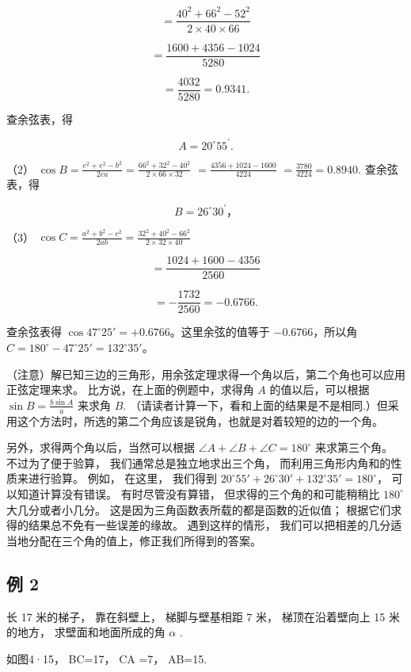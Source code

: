 \[
= \frac {40 ^ {2} + 66 ^ {2} - 52 ^ {2}}{2 \times 40 \times 66}
\]

\[
= \frac {1600 + 4356 - 1024}{5280}
\]

\[
= \frac {4032}{5280} = 0.9341.
\]

查余弦表，得

\[
A = 20 ^{\circ} 55 ^{\prime}.
\]

（2）
\(\cos B = \frac{e^2 + e^2 - b^2}{2ca} = \frac{66^2 + 32^2 - 40^2}{2 \times 66 \times 32}\)
\(= \frac{4356 + 1024 - 1600}{4224}\) \(= \frac{3780}{4224} = 0.8940.\)
查余弦表，得

\[
B = 26 ^{\circ} 30 ^{\prime}\text{，}
\]

（3）
\(\cos C = \frac{a^2 + b^2 - c^2}{2ab} = \frac{32^2 + 40^2 - 66^2}{2 \times 32 \times 40}\)

\[
= \frac {1024 + 1600 - 4356}{2560}
\]

\[
= - \frac {1732}{2560} = - 0.6766.
\]

查余弦表得 \(\cos 47^{\circ}25' = +0.6766\)。这里余弦的值等于
\(-0.6766\)，所以角
\(C = 180^{\circ} - 47^{\circ}25' = 132^{\circ}35'\)。

（注意）解已知三边的三角形，用余弦定理求得一个角以后，第二个角也可以应用正弦定理来求。
比方说，在上面的例题中，求得角 \(A\) 的值以后，可以根据
\(\sin B = \frac{b\sin A}{a}\) 来求角 \(B\).
（请读者计算一下，看和上面的结果是不是相同.）但采用这个方法时，所选的第二个角应该是锐角，也就是对着较短的边的一个角。

另外，求得两个角以后，当然可以根据
\(\angle A + \angle B + \angle C = 180^{\circ}\) 来求第三个角。
不过为了便于验算， 我们通常总是独立地求出三个角，
而利用三角形内角和的性质来进行验算。 例如， 在这里， 我们得到
\(20^{\circ}55' + 26^{\circ}30' + 132^{\circ}35' = 180^{\circ}\)，
可以知道计算没有错误。 有时尽管没有算错， 但求得的三个角的和可能稍稍比
\(180^{\circ}\) 大几分或者小几分。
这是因为三角函数表所载的都是函数的近似值；
根据它们求得的结果总不免有一些误差的缘故。 遇到这样的情形，
我们可以把相差的几分适当地分配在三个角的值上，修正我们所得到的答案。

\subsection{例 2}

长 17 米的梯子， 靠在斜壁上， 梯脚与壁基相距 7 米， 梯顶在沿着壁向上 15
米的地方， 求壁面和地面所成的角 \(\alpha\) .

 如图4·15， BC=17， CA =7， AB=15.


